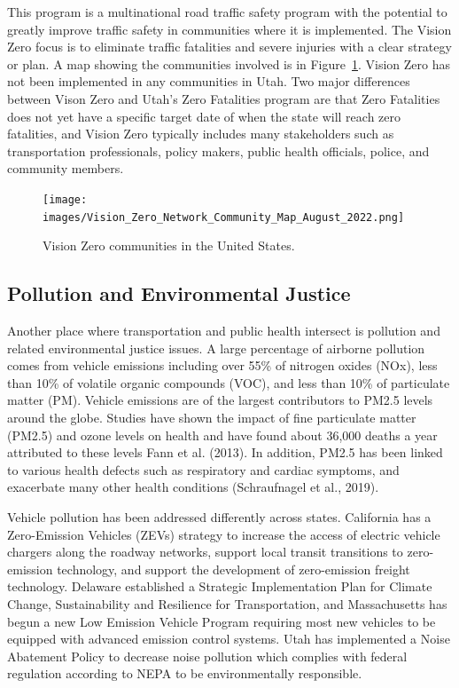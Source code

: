 \documentclass[
  letterpaper,
  DIV=11,
  numbers=noendperiod]{scrreport}
\begin{document}
This program is a multinational road traffic safety program with the
potential to greatly improve traffic safety in communities where it is
implemented. The Vision Zero focus is to eliminate traffic fatalities
and severe injuries with a clear strategy or plan. A map showing the
communities involved is in Figure~\ref{fig-visionzero}. Vision Zero has
not been implemented in any communities in Utah. Two major differences
between Vison Zero and Utah's Zero Fatalities program are that Zero
Fatalities does not yet have a specific target date of when the state
will reach zero fatalities, and Vision Zero typically includes many
stakeholders such as transportation professionals, policy makers, public
health officials, police, and community members.

\begin{figure}[t]

{\centering \texttt{[image: images/Vision\_Zero\_Network\_Community\_Map\_August\_2022.png]}

}

\caption{\label{fig-visionzero}Vision Zero communities in the United
States.}

\end{figure}

\hypertarget{pollution-and-environmental-justice}{%
\subsection{Pollution and Environmental
Justice}\label{pollution-and-environmental-justice}}

Another place where transportation and public health intersect is
pollution and related environmental justice issues. A large percentage
of airborne pollution comes from vehicle emissions including over 55\%
of nitrogen oxides (NOx), less than 10\% of volatile organic compounds
(VOC), and less than 10\% of particulate matter (PM). Vehicle emissions
are of the largest contributors to PM2.5 levels around the globe.
Studies have shown the impact of fine particulate matter (PM2.5) and
ozone levels on health and have found about 36,000 deaths a year
attributed to these levels Fann et al. (2013). In addition, PM2.5 has
been linked to various health defects such as respiratory and cardiac
symptoms, and exacerbate many other health conditions (Schraufnagel et
al., 2019).

Vehicle pollution has been addressed differently across states.
California has a Zero-Emission Vehicles (ZEVs) strategy to increase the
access of electric vehicle chargers along the roadway networks, support
local transit transitions to zero-emission technology, and support the
development of zero-emission freight technology. Delaware established a
Strategic Implementation Plan for Climate Change, Sustainability and
Resilience for Transportation, and Massachusetts has begun a new Low
Emission Vehicle Program requiring most new vehicles to be equipped with
advanced emission control systems. Utah has implemented a Noise
Abatement Policy to decrease noise pollution which complies with federal
regulation according to NEPA to be environmentally responsible.
\end{document}
